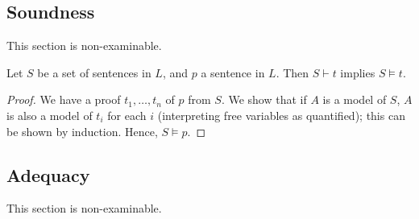 \subsection{Soundness}
This section is non-examinable.
\begin{proposition}
    Let $S$ be a set of sentences in $L$, and $p$ a sentence in $L$.
    Then $S \vdash t$ implies $S \models t$.
\end{proposition}
\begin{proof}
    We have a proof $t_1, \dots, t_n$ of $p$ from $S$.
    We show that if $A$ is a model of $S$, $A$ is also a model of $t_i$ for each $i$ (interpreting free variables as quantified); this can be shown by induction.
    Hence, $S \models p$.
\end{proof}

\subsection{Adequacy}
This section is non-examinable.

